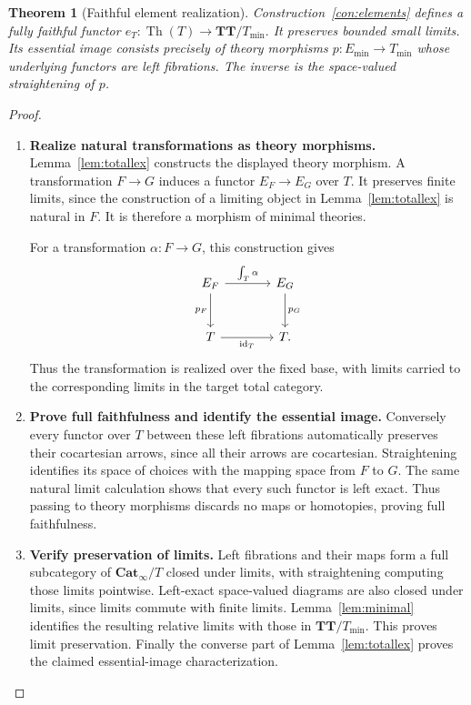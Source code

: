 \documentclass[oneside]{article}
\theoremstyle{plain}
\newtheorem{theorem}{Theorem}[section]
\theoremstyle{definition}
\theoremstyle{remark}
\newcommand{\Cat}{\mathbf{Cat}_{\infty}}
\newcommand{\TT}{\mathbf{TT}}
\newcommand{\Th}{\operatorname{Th}}
\newcommand{\eT}{e_T}
\newcommand{\id}{\operatorname{id}}
\newcommand{\minrep}{\mathrm{min}}
\begin{document}
\begin{theorem}[Faithful element realization]\label{thm:elementembedding}
Construction~\ref{con:elements} defines a fully faithful functor $\eT:\Th(T)\longrightarrow\TT/T_{\minrep}.$ It preserves bounded small limits. Its essential image consists precisely of theory morphisms $p:E_{\minrep}\to T_{\minrep}$ whose underlying functors are left fibrations. The inverse is the space-valued straightening of $p$.
\end{theorem}
\begin{proof}
\leavevmode
\begin{enumerate}
\item \textbf{Realize natural transformations as theory morphisms.} Lemma~\ref{lem:totallex} constructs the displayed theory morphism. A transformation $F\to G$ induces a functor $E_F\to E_G$ over $T$. It preserves finite limits, since the construction of a limiting object in Lemma~\ref{lem:totallex} is natural in $F$. It is therefore a morphism of minimal theories.
\begin{samepage}
For a transformation $\alpha:F\to G$, this construction gives
\[
\begin{tikzcd}[column sep=large,row sep=large]
 E_F\ar[r,"\int_T\alpha"]\ar[d,"p_F"']&E_G\ar[d,"p_G"]\\
 T\ar[r,"\id_T"']&T.
\end{tikzcd}
\]
Thus the transformation is realized over the fixed base, with limits
carried to the corresponding limits in the target total category.
\end{samepage}
\item \textbf{Prove full faithfulness and identify the essential image.} Conversely every functor over $T$ between these left fibrations automatically preserves their cocartesian arrows, since all their arrows are cocartesian. Straightening identifies its space of choices with the mapping space from $F$ to $G$. The same natural limit calculation shows that every such functor is left exact. Thus passing to theory morphisms discards no maps or homotopies, proving full faithfulness.
\item \textbf{Verify preservation of limits.} Left fibrations and their maps form a full subcategory of $\Cat/T$ closed under limits, with straightening computing those limits pointwise. Left-exact space-valued diagrams are also closed under limits, since limits commute with finite limits. Lemma~\ref{lem:minimal} identifies the resulting relative limits with those in $\TT/T_{\minrep}$. This proves limit preservation. Finally the converse part of Lemma~\ref{lem:totallex} proves the claimed essential-image characterization.\qedhere
\end{enumerate}
\end{proof}
\end{document}
